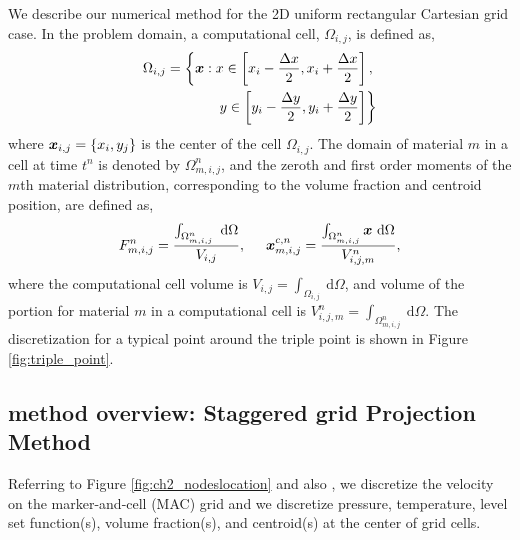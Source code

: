 \documentclass[]{article}
\newcommand{\bmx}{\mbox{\boldmath $x$\unboldmath}}
\begin{document}
We describe our numerical method for the 
2D uniform rectangular Cartesian grid
case.  
In the problem domain, a computational cell, $\Omega_{i,j}$, is defined as,
\begin{eqnarray}
  \label{eq:cell_def}
  \Omega_{i,j} = 
   \left\{ \bmx: x \in \left[x_i-\frac{\Delta x}{2}, x_i+\frac{\Delta x}{2}\right],\right.\\
   \left. y \in \left[ y_i-\frac{\Delta y}{2}, y_i+\frac{\Delta y}{2}\right] \right\}
\end{eqnarray}
where $\bmx_{i,j} = \left\{x_i,y_j\right\}$ is the 
center of the cell $\Omega_{i,j}$. The domain of 
material $m$ in a cell at time $t^n$ is denoted by $\Omega_{m,i,j}^n$, 
and the zeroth and first order moments of the $m$th material 
distribution, corresponding to the volume fraction and 
centroid position, are defined as,
\begin{equation}
  \label{eq:moments_def}
  F_{m,i,j}^n = \frac{\int_{\Omega_{m,i,j}^n} ~\mathrm{d} \Omega}{V_{i,j}}, \hspace{0.5cm}\bmx_{m,i,j}^{c,n} = \frac{\int_{\Omega_{m,i,j}^n} \bmx ~\mathrm{d} \Omega}{V_{i,j,m}^n},
\end{equation}
where the computational cell volume is $V_{i,j} = \int_{\Omega_{i,j}} ~\mathrm{d} \Omega$, and volume of the portion for material $m$ in a computational cell is $V_{i,j,m}^n= \int_{\Omega_{m,i,j}^n} ~\mathrm{d} \Omega$. The discretization for a typical point around the triple point is shown in Figure \ref{fig:triple_point}.

\subsection{method overview: Staggered grid Projection Method}

Referring to Figure \ref{fig:ch2_nodeslocation} and also 
\cite{pei2019hierarchical,VAHAB2021}, 
we discretize the velocity on the marker-and-cell (MAC) grid and we
discretize pressure, temperature, level set function(s), volume fraction(s),
and centroid(s) at the center of grid cells.
\end{document}
